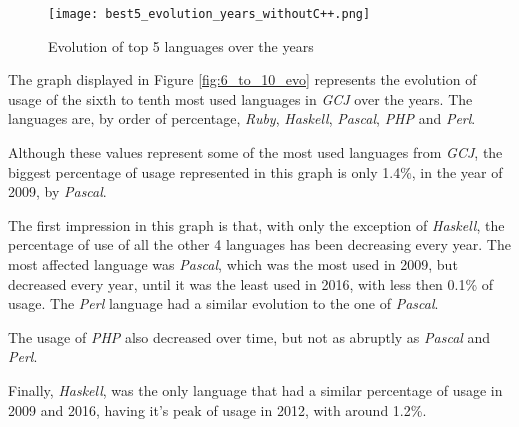 \documentclass{article}
\begin{document}
\begin{multicols*}{2}
\begin{figure}[H]
    \centering
    \texttt{[image: best5\_evolution\_years\_withoutC++.png]}
    \caption{Evolution of top 5 languages over the years}
    \label{fig:top5_evo}
\end{figure}






The graph displayed in Figure \ref{fig:6_to_10_evo} represents the evolution of usage of the sixth to tenth most used languages in \textit{GCJ} over the years. The languages are, by order of percentage, \textit{Ruby}, \textit{Haskell}, \textit{Pascal}, \textit{PHP} and \textit{Perl}.

Although these values represent some of the most used languages from \textit{GCJ}, the biggest percentage of usage represented in this graph is only 1.4\%, in the year of 2009, by \textit{Pascal}.

The first impression in this graph is that, with only the exception of \textit{Haskell}, the percentage of use of all the other 4 languages has been decreasing every year. The most affected language was \textit{Pascal}, which was the most used in 2009, but decreased every year, until it was the least used in 2016, with less then 0.1\% of usage. The \textit{Perl} language had a similar evolution to the one of \textit{Pascal}.

The usage of \textit{PHP} also decreased over time, but not as abruptly as \textit{Pascal} and \textit{Perl}.

Finally, \textit{Haskell}, was the only language that had a similar percentage of usage in 2009 and 2016, having it's peak of usage in 2012, with around 1.2\%.


\end{multicols*}
\end{document}
